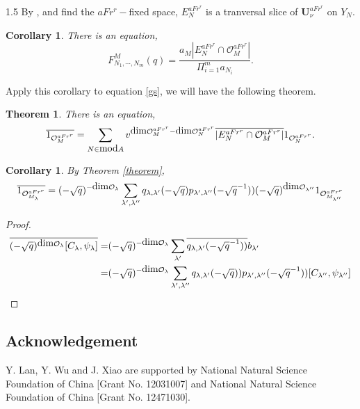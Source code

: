 \documentclass[10pt]{amsart}
\newtheorem{corollary}[theorem]{Corollary}
\newtheorem{thm}{Theorem}
\def\dim{\mbox{\rm dim}}   \def\End{\mbox{\rm End}}
\def\mod{\mbox{\rm mod}} \def\mx{\mbox{\rm max}} \def\tr{\mbox{\rm tr}}
\def\bfU{\mathbf{U}}
\newcommand\mo{{\mathcal{O}}}
\begin{document}
\begin{spacing}{1.5}
By \cite[Proposition 2.5]{2004The}, and find the $aFr^r-$fixed space, $E_{N}^{aFr^r}$ is a tranversal slice of $\bfU_{\nu}^{aFr^r}$ on $Y_N$.

\begin{corollary}
There is an equation,
$$F_{N_1,\cdots,N_m}^M(q)=\frac{a_M|E_N^{aFr^r}\cap \mo^{aFr^r}_{M}|}{\Pi_{i=1}^ma_{N_i}}.$$
\end{corollary}
Apply this corollary to equation \ref{gs}, we will have the following theorem.
\begin{thm}
There is an equation,
$$\overline{1_{\mo^{aFr^r}_M}}=\sum_{N\in \mod{A}}v^{\dim \mo^{aFr^r}_{M}-\dim \mo^{aFr^r}_{N}}\overline{|E_N^{aFr^r}\cap \mo^{aFr^r}_{M}|}1_{\mo^{aFr^r}_N}.$$
\end{thm}
\begin{corollary}
By Theorem \ref{theorem}, $$\overline{1_{\mo^{aFr^r}_{M_{\lambda}}}}=(-\sqrt{q})^{-\dim\mo_{\lambda}}\sum_{\lambda',\lambda''}q_{\lambda,\lambda'}(-\sqrt{q})p_{\lambda',\lambda''}(-\sqrt{q}^{-1}))(-\sqrt{q})^{\dim\mo_{\lambda''}}1_{\mo^{aFr^r}_{M_{\lambda''}}}$$
\end{corollary}
\begin{proof}
 $$\begin{aligned}\overline{(-\sqrt{q})^{\dim\mo_{\lambda}}[C_{\lambda},\psi_{\lambda}]}=&(-\sqrt{q})^{-\dim\mo_{\lambda}}\sum_{\lambda'}\overline{q_{\lambda,\lambda'}(-\sqrt{q}^{-1}))}b_{\lambda'}\\=&(-\sqrt{q})^{-\dim\mo_{\lambda}}\sum_{\lambda',\lambda''}q_{\lambda,\lambda'}(-\sqrt{q}))p_{\lambda',\lambda''}(-\sqrt{q}^{-1}))[C_{\lambda''},\psi_{\lambda''}]\end{aligned}$$
\end{proof}
\subsection*{Acknowledgement} 
Y. Lan, Y. Wu and J. Xiao are supported by National Natural Science Foundation of China [Grant No. 12031007]
and National Natural Science Foundation of China [Grant No. 12471030].
\end{spacing}


\end{document}
